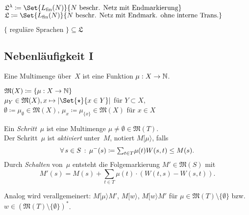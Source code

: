 \documentclass{cheat-sheet}
\newcommand{\activeTransition}[1]{[{#1}\rangle} %
\newcommand{\Markings}{\mathfrak{M}} %
\newcommand{\Lang}{\mathfrak{L}} %
\newcommand{\fin}{\mathrm{fin}} %
\newcommand{\Multisets}{\mathfrak{M}} %
\begin{document}
\begin{nota}
  $\Lang^\lambda \coloneqq \Set{L_\fin(N)}{N \text{ beschr. Netz mit Endmarkierung}}$ \\
  $\Lang \coloneqq \Set{L_\fin(N)}{N \text{ beschr. Netz mit Endmark. ohne interne Trans.}}$
\end{nota}

\begin{satz}
  $\{ \text{ reguläre Sprachen } \} \subseteq \Lang$
\end{satz}

\subsection{Nebenläufigkeit I}

\begin{defn}
  Eine Multimenge über~$X$ ist eine Funktion $\mu : X \to \mathbb{N}$.
\end{defn}

\begin{nota}
  \begin{minipage}[t]{0.8 \linewidth}
    $\Multisets(X) \coloneqq \{ \mu : X \to \N \}$ \\
    $\mu_Y \in \Multisets(X), x \mapsto \card{\Set{\star}{x \in Y}}$ für $Y \subset X$, \\
    $\emptyset \coloneqq \mu_\emptyset \in \Multisets(X)$, \enspace
    $\mu_x \coloneqq \mu_{\{ x \}} \in \Multisets(X)$ für $x \in X$
  \end{minipage}
\end{nota}

\begin{defn}
  Ein \emph{Schritt}~$\mu$ ist eine Multimenge $\mu \neq \emptyset \in \Multisets(T)$. \\
  Der Schritt~$\mu$ ist \emph{aktiviert} unter~$M$, notiert $M \activeTransition{\mu}$, falls
  \[
    \fa{s \in S} \mu^{-}(s) \coloneqq {\sum}_{t \in T} \mu(t) W(s, t) \leq M(s).
  \]
  Durch \textit{Schalten} von~$\mu$ entsteht die Folgemarkierung $M' \in \Markings(S)$ mit
  \[
    M'(s) = M(s) + {\sum}_{t \in T} \mu(t) \cdot (W(t, s) - W(s, t)).
  \]
\end{defn}

\begin{bem}
  Analog wird verallgemeinert:
  $M \activeTransition{\mu} M'$, $M \activeTransition{w}$, $M \activeTransition{w} M'$
  für $\mu \in \Markings(T) \setminus \{ \emptyset \}$ bzw. $w \in (\Markings(T) \setminus \{ \emptyset \})^{*}$.
\end{bem}
\end{document}
